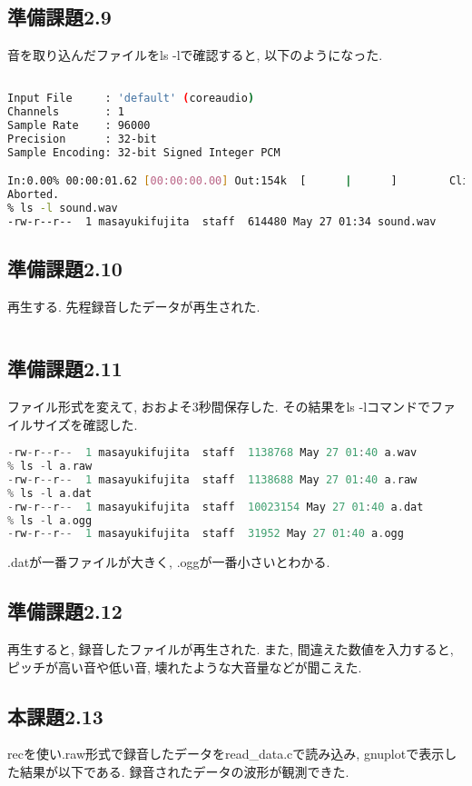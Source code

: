 \documentclass{ltjsarticle}
\begin{document}
\subsection{準備課題2.9}
音を取り込んだファイルをls -lで確認すると, 以下のようになった. 
\begin{lstlisting}[caption=recコマンド,language=bash]
% rec sound.wav

Input File     : 'default' (coreaudio)
Channels       : 1
Sample Rate    : 96000
Precision      : 32-bit
Sample Encoding: 32-bit Signed Integer PCM

In:0.00% 00:00:01.62 [00:00:00.00] Out:154k  [      |      ]        Clip:0    ^C
Aborted.
% ls -l sound.wav
-rw-r--r--  1 masayukifujita  staff  614480 May 27 01:34 sound.wav
\end{lstlisting}

\subsection{準備課題2.10}
再生する. 先程録音したデータが再生された. 
\begin{lstlisting}[caption=playコマンド,language=bash]
% play sound.wav
\end{lstlisting}

\subsection{準備課題2.11}
ファイル形式を変えて, おおよそ3秒間保存した. その結果をls -lコマンドでファイルサイズを確認した. 
\begin{lstlisting}[caption=ファイル形式,language=C]
% ls -l a.wav
-rw-r--r--  1 masayukifujita  staff  1138768 May 27 01:40 a.wav
% ls -l a.raw
-rw-r--r--  1 masayukifujita  staff  1138688 May 27 01:40 a.raw
% ls -l a.dat
-rw-r--r--  1 masayukifujita  staff  10023154 May 27 01:40 a.dat
% ls -l a.ogg
-rw-r--r--  1 masayukifujita  staff  31952 May 27 01:40 a.ogg
\end{lstlisting}
.datが一番ファイルが大きく, .oggが一番小さいとわかる. 

\subsection{準備課題2.12}
再生すると, 録音したファイルが再生された. また, 間違えた数値を入力すると, ピッチが高い音や低い音, 壊れたような大音量などが聞こえた. 

\subsection{本課題2.13}
recを使い.raw形式で録音したデータをread\_data.cで読み込み, gnuplotで表示した結果が以下である. 録音されたデータの波形が観測できた. 
\end{document}
